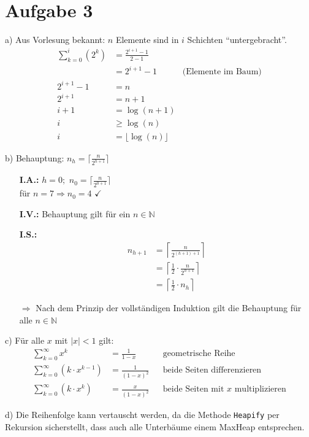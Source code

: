 \section*{Aufgabe 3}
a) Aus Vorlesung bekannt: $n$ Elemente sind in $i$ Schichten \enquote{untergebracht}. 
\begin{align*}
	\sum_{k=0}^i \left( 2^k \right) &= \frac{2^{i + 1} - 1}{2 - 1} \\
    &= 2^{i + 1} - 1 &\text{(Elemente im Baum)} \\[0.5cm]
    2^{i + 1} - 1 &= n \\
    2^{i + 1} &= n + 1 \\
    i + 1 &= \log(n + 1) \\
    i &\geq \log(n) \\
    i &= \lfloor \log(n) \rfloor
\end{align*}

b) Behauptung: $n_h = \lceil \frac{n}{2^{h+1}} \rceil$
\begin{itemize}[noitemsep]
	\item[\textbf{I.A.:}] $h = 0;$
    $n_0 = \lceil \frac{n}{2^{0 + 1}} \rceil$ \\
    für $n=7 \Rightarrow n_0 = 4$ $\checkmark$
	\item[\textbf{I.V.:}] Behauptung gilt für ein $n \in \mathbb{N}$
	\item[\textbf{I.S.:}]
      \begin{align*}
      	n_{h+1} &= \left\lceil \frac{n}{2^{(h + 1) + 1}} \right\rceil \\
        &= \left\lceil \frac{1}{2} \cdot \frac{n}{2^{h+1}} \right\rceil \\
        &= \left\lceil \frac{1}{2} \cdot n_h \right\rceil
      \end{align*}    
    \item[$\Rightarrow$] Nach dem Prinzip der vollständigen Induktion gilt die Behauptung für alle $n \in \mathbb{N}$
\end{itemize}

c) Für alle $x$ mit $|x| < 1$ gilt: 
\begin{align*}
	\sum_{k=0}^\infty x^k &= \frac{1}{1 - x} &&\text{geometrische Reihe} \\
    \sum_{k=0}^\infty \left( k \cdot x^{k - 1} \right) &= \frac{1}{(1 - x)^2} &&\text{beide Seiten differenzieren} \\
    \sum_{k=0}^\infty \left( k \cdot x^k \right) &= \frac{x}{(1 - x)^2} &&\text{beide Seiten mit $x$ multiplizieren}
\end{align*}

d) Die Reihenfolge kann vertauscht werden, da die Methode \texttt{Heapify} per Rekursion sicherstellt, dass auch alle Unterbäume einem MaxHeap entsprechen. 